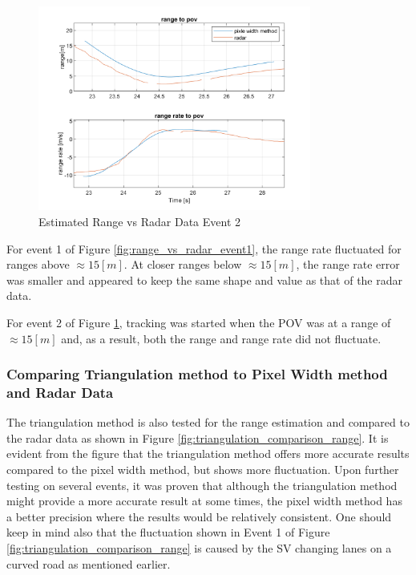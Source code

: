 \begin{figure}[H]
    \centering
    \includegraphics[width=0.8\textwidth]{FiguresMat/radar_compare_116147345.png}
    \caption{Estimated Range vs Radar Data Event 2}
    \label{fig:range_vs_radar_event2}
\end{figure}



For event 1 of Figure \ref{fig:range_vs_radar_event1}, the range rate fluctuated for ranges above $\approx 15[m]$. At closer ranges below $\approx 15[m]$, the range rate error was smaller and appeared to keep the same shape and value as that of the radar data. 

For event 2 of Figure \ref{fig:range_vs_radar_event2}, tracking was started when the POV was at a range of $\approx 15[m]$ and, as a result, both the range and range rate did not fluctuate.

\subsubsection{Comparing Triangulation method to Pixel Width method and Radar Data}

The triangulation method is also tested for the range estimation and compared to the radar data as shown in Figure \ref{fig:triangulation_comparison_range}. It is evident from the figure that the triangulation method offers more accurate results compared to the pixel width method, but shows more fluctuation. Upon further testing on several events, it was proven that although the triangulation method might provide a more accurate result at some times, the pixel width method has a better precision where the results would be relatively consistent. One should keep in mind also that the fluctuation shown in Event 1 of Figure \ref{fig:triangulation_comparison_range} is caused by the SV changing lanes on a curved road as mentioned earlier.


